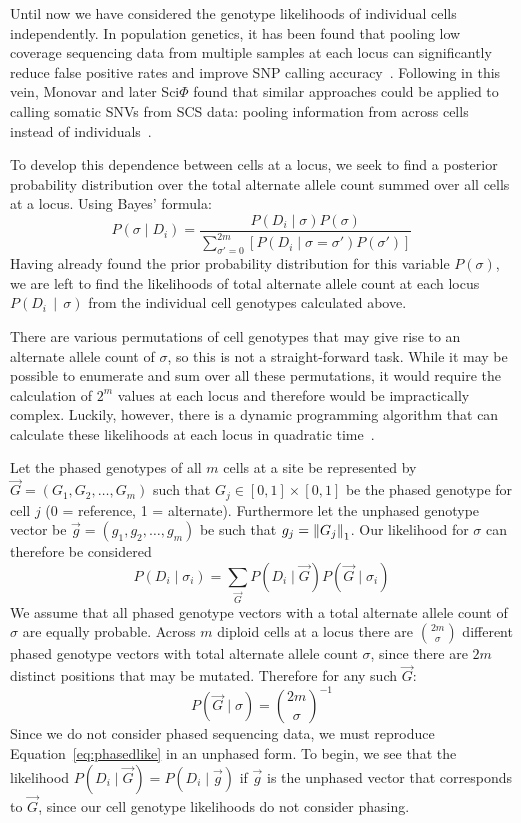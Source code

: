 \documentclass[../../main.tex]{subfiles}
\begin{document}
Until now we have considered the genotype likelihoods of individual cells independently.
In population genetics, it has been found that pooling low coverage sequencing data from multiple samples at each locus can significantly reduce false positive rates and improve SNP calling accuracy~\cite{ledurbin, listatistical}.
Following in this vein, Monovar and later Sci$\Phi$ found that similar approaches could be applied to calling somatic SNVs from SCS data: pooling information from across cells instead of individuals~\cite{monovar, sciphi}.

To develop this dependence between cells at a locus, we seek to find a posterior probability distribution over the total alternate allele count summed over all cells at a locus.
Using Bayes' formula:
\begin{equation}\label{eq:sitebayes}
P\left(\sigma \mid D_i\right) = \frac{P(D_i\mid \sigma)P(\sigma)}{\sum_{\sigma'=0}^{2m}[P(D_i\mid \sigma=\sigma')P(\sigma')]}
\end{equation}
Having already found the prior probability distribution for this variable $P(\sigma)$, we are left to find the likelihoods of total alternate allele count at each locus $P(D_i\,\mid\,\sigma)$ from the individual cell genotypes calculated above.

There are various permutations of cell genotypes that may give rise to an alternate allele count of $\sigma$, so this is not a straight-forward task.
While it may be possible to enumerate and sum over all these permutations, it would require the calculation of $2^m$ values at each locus and therefore would be impractically complex.
Luckily, however, there is a dynamic programming algorithm that can calculate these likelihoods at each locus in quadratic time~\cite{ledurbin, listatistical, monovar}.

Let the phased genotypes of all $m$ cells at a site be represented by $\vec{G} = (G_1,G_2,\dots,G_m)$ such that $G_j\in [0,1]\times[0,1]$ be the phased genotype for cell $j$ (0 = reference, 1 = alternate).
Furthermore let the unphased genotype vector be $\vec{g} = (g_1,g_2,\dots,g_m)$ be such that $g_j = \left\lVert G_j\right\rVert_1$.
Our likelihood for $\sigma$ can therefore be considered
\begin{equation} \label{eq:phasedlike}
P(D_i\mid\sigma_i) = \sum_{\vec{G}} P(D_i \mid \vec{G}) P(\vec{G} \mid \sigma_i)
\end{equation}
We assume that all phased genotype vectors with a total alternate allele count of $\sigma$ are equally probable.
Across $m$ diploid cells at a locus there are $\binom{2m}{\sigma}$ different phased genotype vectors with total alternate allele count $\sigma$, since there are $2m$ distinct positions that may be mutated.
Therefore for any such $\vec{G}$:
\begin{equation*}
P(\vec{G}\mid \sigma) = \binom{2m}{\sigma}^{-1}
\end{equation*}
Since we do not consider phased sequencing data, we must reproduce Equation~\eqref{eq:phasedlike} in an unphased form.
To begin, we see that the likelihood $P(D_i\mid \vec{G}) = P(D_i\mid \vec{g})$ if $\vec{g}$ is the unphased vector that corresponds to $\vec{G}$, since our cell genotype likelihoods do not consider phasing.
\end{document}
